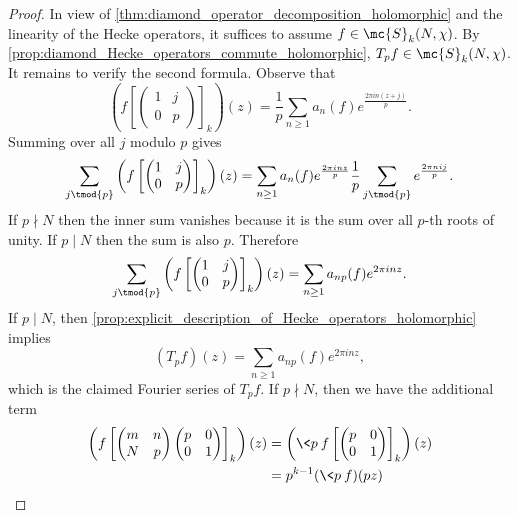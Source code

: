     \begin{proof}
      In view of \cref{thm:diamond_operator_decomposition_holomorphic} and the linearity of the Hecke operators, it suffices to assume $f \in \mc{S}_{k}(N,\chi)$. By \cref{prop:diamond_Hecke_operators_commute_holomorphic}, $T_{p}f \in \mc{S}_{k}(N,\chi)$. It remains to verify the second formula. Observe that
      \[
        \left(f\left[\begin{pmatrix} 1 & j \\ 0 & p \end{pmatrix}\right]_{k}\right)(z) = \frac{1}{p}\sum_{n \ge 1}a_{n}(f)e^{\frac{2\pi in(z+j)}{p}}.
      \]
      Summing over all $j$ modulo $p$ gives
      \[
        \sum_{j \tmod{p}}\left(f\left[\begin{pmatrix} 1 & j \\ 0 & p \end{pmatrix}\right]_{k}\right)(z) = \sum_{n \ge 1}a_{n}(f)e^{\frac{2\pi inz}{p}}\frac{1}{p}\sum_{j \tmod{p}}e^{\frac{2\pi nij}{p}}.
      \]
      If $p \nmid N$ then the inner sum vanishes because it is the sum over all $p$-th roots of unity. If $p \mid N$ then the sum is also $p$. Therefore
      \[
        \sum_{j \tmod{p}}\left(f\left[\begin{pmatrix} 1 & j \\ 0 & p \end{pmatrix}\right]_{k}\right)(z) = \sum_{n \ge 1}a_{np}(f)e^{2\pi inz}.
      \]
      If $p \mid N$, then \cref{prop:explicit_description_of_Hecke_operators_holomorphic} implies
      \begin{equation}\label{equ:Hecke_operator_when_p_divides_holomorphic}
        (T_{p}f)(z) = \sum_{n \ge 1}a_{np}(f)e^{2\pi inz},
      \end{equation}
      which is the claimed Fourier series of $T_{p}f$. If $p \nmid N$, then we have the additional term
      \begin{align*}
        \left(f\left[\begin{pmatrix} m & n \\ N & p \end{pmatrix}\begin{pmatrix} p & 0 \\ 0 & 1 \end{pmatrix}\right]_{k}\right)(z) &= \left(\<p\>f\left[\begin{pmatrix} p & 0 \\ 0 & 1 \end{pmatrix}\right]_{k}\right)(z) \\
        &= p^{k-1}(\<p\>f)(pz) \\

\end{align*}
\end{proof}
